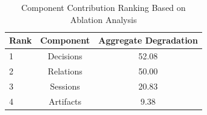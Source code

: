 \begin{table}[htbp]
\centering
\caption{Component Contribution Ranking Based on Ablation Analysis}
\label{tab:crme-component-ranking}
\begin{tabular}{lcc}
\toprule
Rank & Component & Aggregate Degradation \\
\midrule
1 & Decisions & 52.08 \\
2 & Relations & 50.00 \\
3 & Sessions & 20.83 \\
4 & Artifacts & 9.38 \\
\bottomrule
\end{tabular}
\end{table}
